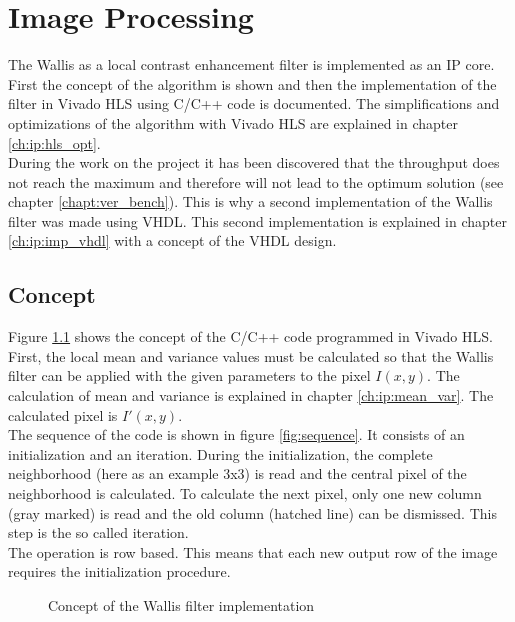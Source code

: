 %
%
\chapter{Image Processing}  \label{chapt:image_processing}
The Wallis as a local contrast enhancement filter is implemented as an IP core. First the concept of the algorithm is shown and then the implementation of the filter in Vivado HLS using C/C++ code is documented. The simplifications and optimizations of the algorithm with Vivado HLS are explained in chapter \ref{ch:ip:hls_opt}. \\
During the work on the project it has been discovered that the throughput does not reach the maximum and therefore will not lead to the optimum solution (see chapter \ref{chapt:ver_bench}). This is why a second implementation of the Wallis filter was made using VHDL. This second implementation is explained in chapter \ref{ch:ip:imp_vhdl} with a concept of the VHDL design.

\section{Concept} \label{ch:ip:concept}
Figure \ref{fig:concept} shows the concept of the C/C++ code programmed in Vivado HLS. First, the local mean and variance values must be calculated so that the Wallis filter can be applied with the given parameters to the pixel $I(x,y)$. The calculation of mean and variance is explained in chapter \ref{ch:ip:mean_var}. The calculated pixel is $I'(x,y)$. \\
The sequence of the code is shown in figure \ref{fig:sequence}. It consists of an initialization and an iteration. During the initialization, the complete neighborhood (here as an example 3x3) is read and the central pixel of the neighborhood is calculated. To calculate the next pixel, only one new column (gray marked) is read and the old column (hatched line) can be dismissed. This step is the so called iteration.\\
The operation is row based. This means that each new output row of the image requires the initialization procedure.

\begin{figure}[tb!]
    \centering
    \begin{adjustbox}{max width=0.9\textwidth}
        
    \end{adjustbox}
    \caption{Concept of the Wallis filter implementation}
    \label{fig:concept}
\end{figure}

